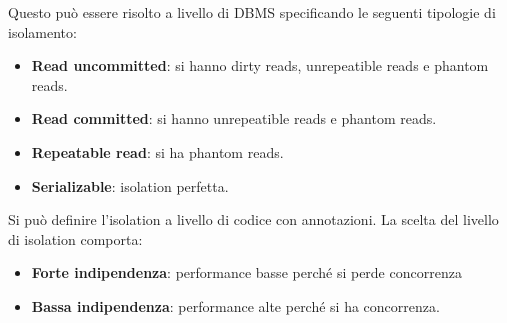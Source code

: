 Questo può essere risolto a livello di DBMS specificando le seguenti tipologie
di isolamento:
\begin{itemize}
      \item \textbf{Read uncommitted}: si hanno dirty reads, unrepeatible reads e
            phantom reads.
      \item \textbf{Read committed}: si hanno unrepeatible reads e phantom reads.
      \item \textbf{Repeatable read}: si ha phantom reads.
      \item \textbf{Serializable}: isolation perfetta.
\end{itemize}
Si può definire l'isolation a livello di codice con annotazioni. La scelta del
livello di isolation comporta:
\begin{itemize}
      \item \textbf{Forte indipendenza}: performance basse perché si perde
            concorrenza
      \item \textbf{Bassa indipendenza}: performance alte perché si ha
            concorrenza.
\end{itemize}